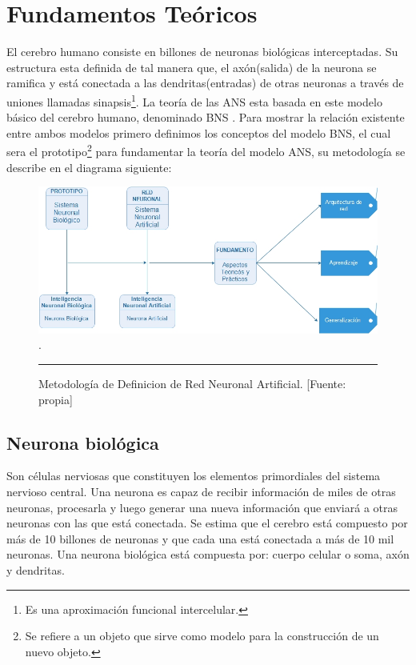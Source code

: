 \documentclass[11pt,titlepage]{report}
\begin{document}
\chapter{Fundamentos Teóricos} 
El cerebro humano consiste en billones de neuronas biológicas interceptadas. Su estructura esta definida de tal manera que, el axón(salida) de la neurona se ramifica y está conectada a las dendritas(entradas) de otras neuronas a través de uniones llamadas sinapsis\footnote{Es una aproximación funcional intercelular.}. La teoría de las ANS esta basada en este modelo básico del cerebro humano, denominado BNS \cite{Art01}. Para mostrar la relación existente entre ambos modelos primero definimos los conceptos del modelo BNS, el cual sera el prototipo\footnote{Se refiere a un objeto que sirve como modelo para la construcción de un nuevo objeto.} para fundamentar la teoría del modelo ANS, su metodología se describe en el diagrama siguiente:

\begin{figure}[h] 
\centering	
\includegraphics[scale=0.7]{Pic/Diagrama01} 
\label{Diagrama01}.
\caption{Metodología de Definicion de Red Neuronal Artificial. [Fuente: propia]}
\hrule
\end{figure}

\section{Neurona biológica}
Son células nerviosas que constituyen los elementos primordiales del sistema nervioso central. Una neurona es capaz de recibir información de miles de otras neuronas, procesarla y luego generar una nueva información que enviará a otras neuronas con las que está conectada. Se estima que el cerebro está compuesto por más de 10 billones de neuronas y que cada una está conectada a más de 10 mil neuronas. Una neurona biológica está compuesta por: cuerpo celular o soma, axón y dendritas.\\  
\end{document}
